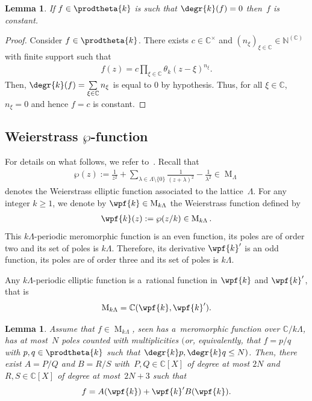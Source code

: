 \documentclass[pdftex]{sigma}
\numberwithin{equation}{section}
\newtheorem{Lemma}[Theorem]{Lemma}
\begin{document}
\begin{Lemma}
If $f \in \prodtheta{k}$ is such that $\degr{k} (f)=0$ then~$f$ is constant.
\end{Lemma}

\begin{proof}
Consider $f \in \prodtheta{k}$.
There exists $c \in \mathbb C^{\times}$ and $(n_{\xi})_{\xi \in \mathbb C}\in \mathbb N^{(\mathbb C)}$ with f\/inite
support such that
\begin{gather*}
f(z)=c  \prod\limits_{\xi \in \mathbb C} \theta_{k}(z-\xi)^{n_{\xi}}.
\end{gather*}
Then, $\degr{k} (f)=\sum\limits_{\xi \in \mathbb C} n_{\xi}$ is equal to $0$ by hypothesis.
Thus, for all $\xi \in \mathbb C$, $n_{\xi}=0$ and hence $f=c$ is constant.
\end{proof}

\subsection[Weierstrass $\wp$-function]{Weierstrass $\boldsymbol{\wp}$-function}

For details on what follows, we refer to~\cite[Chapter~VI]{Silv}.
Recall that
\begin{gather*}
\wp(z):=\frac{1}{z^{2}}+ \sum\limits_{\lambda \in \Lambda \setminus \{0\}} \frac{1}{(z+\lambda)^{2}}
-\frac{1}{\lambda^{2}}\in \operatorname{M}_{\Lambda}
\end{gather*}
denotes the Weierstrass elliptic function associated to the lattice~$\Lambda$.
For any integer $k \geq 1$, we denote by $\wpf{k} \in \operatorname{M}_{k \Lambda}$ the Weierstrass function def\/ined by
\begin{gather*}
\wpf{k}(z):=\wp(z/k)\in \operatorname{M}_{k\Lambda}.
\end{gather*}
This $k\Lambda$-periodic meromorphic function is an even function, its poles are of order two and its set of poles is
$k\Lambda$.
Therefore, its derivative $\wpf{k}'$ is an odd function, its poles are of order three and its set of poles is
$k\Lambda$.

Any $k\Lambda$-periodic elliptic function is a~rational function in $\wpf{k}$ and $\wpf{k}'$, that is
\begin{gather*}
\operatorname{M}_{k\Lambda}=\mathbb C(\wpf{k},\wpf{k}').
\end{gather*}

\begin{Lemma}
\label{lem2}
Assume that $f \in \operatorname{M}_{k\Lambda}$, seen has a~meromorphic function over $\mathbb C/k\Lambda$, has at
most~$N$ poles counted with multiplicities $($or, equivalently, that $f=p/q$ with $p,q \in \prodtheta{k}$ such that
${\degr{k} p, \degr{k} q \leq N})$.
Then, there exist $A=P/Q$ and $B=R/S$ with~$P,Q \in \mathbb C[X]$ of degree at most $2N$ and $R,S \in \mathbb C[X]$ of
degree at most~$2N+3$ such that
\begin{gather*}
f=A(\wpf{k})+\wpf{k}' B(\wpf{k}).
\end{gather*}
\end{Lemma}
\end{document}
